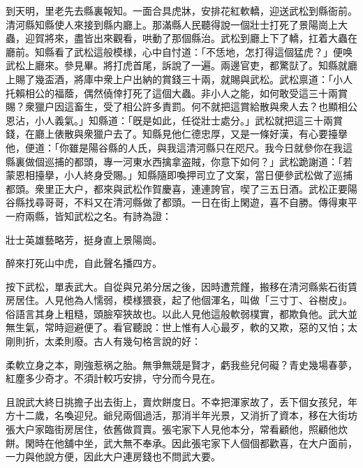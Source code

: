 到天明，里老先去縣裏報知。一面合具虎牀，安排花紅軟轎，迎送武松到縣衙前。清河縣知縣使人來接到縣内廳上。那滿縣人民聽得說一個壯士打死了景陽崗上大蟲，迎賀將來，盡皆出來觀看，哄動了那個縣治。武松到廳上下了轎，扛着大蟲在廳前。知縣看了武松這般模様，心中自忖道：「不恁地，怎打得這個猛虎？」便唤武松上廳來。參見畢。將打虎首尾，訴說了一遍。兩邊官吏，都驚獃了。知縣就廳上賜了幾盃酒，將庫中衆上户出納的賞錢三十兩，就賜與武松。武松禀道：「小人托賴相公的福蔭，偶然僥倖打死了這個大蟲。非小人之能，如何敢受這三十兩賞賜？衆獵户因這畜生，受了相公許多責罰。何不就把這賞給散與衆人去？也顯相公恩沾，小人義氣。」知縣道：「旣是如此，任從壯士處分。」武松就把這三十兩賞錢，在廳上俵散與衆獵户去了。知縣見他仁德忠厚，又是一條好漢，有心要擡擧他，便道：「你雖是陽谷縣的人氏，與我這清河縣只在咫尺。我今日就參你在我這縣裏做個巡捕的都頭，專一河東水西擒拿盗賊，你意下如何？」武松跪謝道：「若蒙恩相擡擧，小人終身受賜。」知縣隨即喚押司立了文案，當日便參武松做了巡捕都頭。衆里正大户，都來與武松作賀慶喜，連連誇官，喫了三五日酒。武松正要陽谷縣找尋哥哥，不料又在清河縣做了都頭。一日在街上閑遊，喜不自勝。傳得東平一府兩縣，皆知武松之名。有詩為證：

\begin{myquote}
壯士英雄藝略芳，挺身直上景陽崗。

醉來打死山中虎，自此聲名播四方。
\end{myquote}
	
按下武松，單表武大。自從與兄弟分居之後，因時遭荒饉，搬移在清河縣紫石街賃房居住。人見他為人懦弱，模様猥衰，起了他個渾名，叫做「三寸丁、谷樹皮」。俗語言其身上粗糙，頭臉窄狹故也。以此人見他這般軟弱樸實，都欺負他。武大並無生氣，常時迴避便了。看官聽說：世上惟有人心最歹，軟的又欺，惡的又怕；太剛則折，太柔則廢。古人有幾句格言說的好：

\begin{myquote}
柔軟立身之本，剛強惹祸之胎。無爭無競是賢才，虧我些兒何礙？青史幾場春夢，紅塵多少奇才。不須計較巧安排，守分而今見在。
\end{myquote}

且說武大終日挑擔子出去街上，賣炊餅度日。不幸把渾家故了，丢下個女孩兒，年方十二歲，名喚迎兒。爺兒兩個過活，那消半年光景，又消折了資本，移在大街坊張大户家臨街房居住，依舊做買賣。張宅家下人見他本分，常看顧他，照顧他炊餅。閑時在他舖中坐，武大無不奉承。因此張宅家下人個個都歡喜，在大户面前，一力與他說方便，因此大户連房錢也不問武大要。

